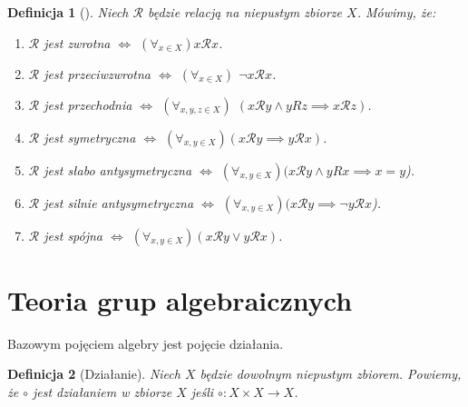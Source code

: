 \documentclass[12pt,a4paper]{report}
\newtheorem{definition}{Definicja}[chapter]
\begin{document}
\begin{definition}[{\citep[Sec 6.2 Def. 6.6]{kraszewski2007wstkep}}]
Niech $\mathcal{R}$ będzie relacją na niepustym zbiorze $X$. Mówimy, że:
\begin{enumerate}
\item
$\mathcal{R}$ jest zwrotna $\iff$ $(\forall_{x\in X}) x\mathcal{R}x$.
\item
$\mathcal{R}$ jest przeciwzwrotna $\iff$ $(\forall_{x\in X})$ $\neg x\mathcal{R}x$.
\item
$\mathcal{R}$ jest przechodnia $\iff$ $(\forall_{x,y,z\in X})$ $(x\mathcal{R}y\land yRz  \implies x\mathcal{R}z)$.
\item
$\mathcal{R}$ jest symetryczna $\iff$ $(\forall_{x,y\in X})(x\mathcal{R}y \implies y\mathcal{R}x)$. 
\item
$\mathcal{R}$ jest słabo antysymetryczna $\iff$ $(\forall_{x,y\in X})( x\mathcal{R}y \land yRx \implies x=y$).
\item
$\mathcal{R}$ jest silnie antysymetryczna $\iff$ $(\forall_{x,y\in X})(x\mathcal{R}y \implies \neg y\mathcal{R}x$).
\item
$\mathcal{R}$ jest spójna $\iff$ $(\forall_{x,y\in X})(x\mathcal{R}y \lor y\mathcal{R}x)$.

\end{enumerate}
\end{definition}
\section{Teoria grup algebraicznych}

Bazowym pojęciem algebry jest pojęcie działania.

\begin{definition}[Działanie{\citep[Sec 4.1]{jedrzejewski2011algebra}}]
Niech $X$ będzie dowolnym niepustym zbiorem. Powiemy, że $\circ$ jest działaniem w zbiorze $X$ jeśli $\circ: X \times X \to X$.
\end{definition}
\end{document}

